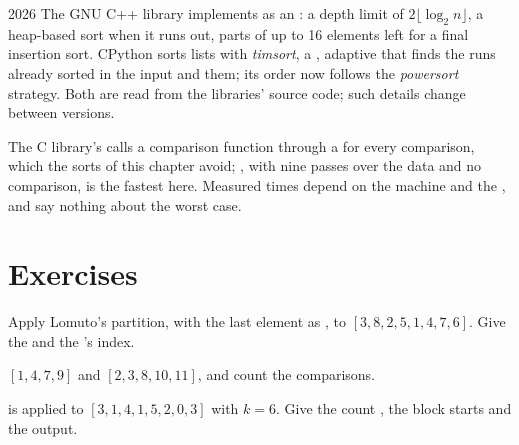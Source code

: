 \begin{dated}{2026}
The GNU C++ library implements  as an : a depth limit of $2\lfloor \log_2 n \rfloor$, a
heap-based sort when it runs out, parts of up to 16 elements left for a final insertion sort. CPython sorts lists with
\emph{timsort}, a , adaptive  that finds the runs already sorted in the input and  them; its 
order now follows the \emph{powersort} strategy. Both are read from the libraries' source code; such details change
between versions.
\end{dated}

\label{out:b1:sorting:timing}

The C library's  calls a comparison function through a  for every comparison, which the sorts of this
chapter avoid; , with nine passes over the data and no comparison, is the fastest here. Measured times depend
on the machine and the , and say nothing about the worst case.

\section{Exercises}\label{sec:b1:sorting:exercises}

\begin{exercise}[$\star$]\label{exo:b1:sorting:1}
Apply Lomuto's partition, with the last element as , to $[3, 8, 2, 5, 1, 4, 7, 6]$. Give the  and the
's index.
\end{exercise}

\begin{exercise}[$\star$]\label{exo:b1:sorting:2}
 $[1, 4, 7, 9]$ and $[2, 3, 8, 10, 11]$, and count the comparisons.
\end{exercise}

\begin{exercise}[$\star$]\label{exo:b1:sorting:3}
 is applied to $[3, 1, 4, 1, 5, 2, 0, 3]$ with $k = 6$. Give the count , the block starts and the
output.
\end{exercise}

